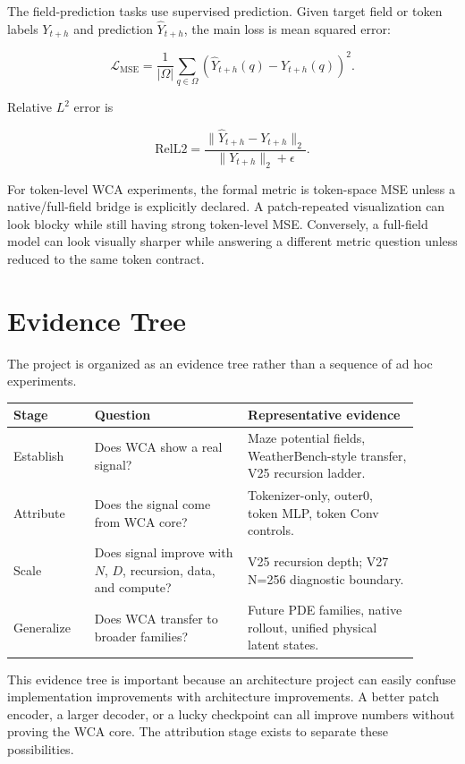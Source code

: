 \documentclass[11pt]{article}
\begin{document}
The field-prediction tasks use supervised prediction. Given target field or
token labels $Y_{t+h}$ and prediction $\hat{Y}_{t+h}$, the main loss is mean
squared error:

\[
\mathcal{L}_{\mathrm{MSE}}
=
\frac{1}{|\Omega|}
\sum_{q\in \Omega}
\left(
\hat{Y}_{t+h}(q)-Y_{t+h}(q)
\right)^2.
\]

Relative $L^2$ error is

\[
\mathrm{RelL2}
=
\frac{\|\hat{Y}_{t+h}-Y_{t+h}\|_2}
{\|Y_{t+h}\|_2+\epsilon}.
\]

For token-level WCA experiments, the formal metric is token-space MSE unless a
native/full-field bridge is explicitly declared. A patch-repeated visualization
can look blocky while still having strong token-level MSE. Conversely, a
full-field model can look visually sharper while answering a different metric
question unless reduced to the same token contract.

\section{Evidence Tree}

The project is organized as an evidence tree rather than a sequence of ad hoc
experiments.

\begin{longtable}{p{0.18\linewidth}p{0.34\linewidth}p{0.38\linewidth}}
\toprule
Stage & Question & Representative evidence \\
\midrule
Establish & Does WCA show a real signal? & Maze potential fields, WeatherBench-style transfer, V25 recursion ladder. \\
Attribute & Does the signal come from WCA core? & Tokenizer-only, outer0, token MLP, token Conv controls. \\
Scale & Does signal improve with $N$, $D$, recursion, data, and compute? & V25 recursion depth; V27 N=256 diagnostic boundary. \\
Generalize & Does WCA transfer to broader families? & Future PDE families, native rollout, unified physical latent states. \\
\bottomrule
\end{longtable}

This evidence tree is important because an architecture project can easily
confuse implementation improvements with architecture improvements. A better
patch encoder, a larger decoder, or a lucky checkpoint can all improve numbers
without proving the WCA core. The attribution stage exists to separate these
possibilities.
\end{document}
